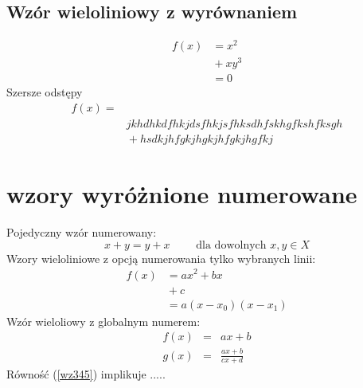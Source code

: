 \documentclass[12pt,oneside,a4paper]{book} %
\theoremstyle{break}
\begin{document}
\subsection{Wzór wieloliniowy z wyrównaniem}
\begin{align*}
f(x) &= x^2\\
& {} + xy^3\\
& = 0
\end{align*}
Szersze odstępy  %
\begin{align*} 
f(x)=&\\[5ex]  
&  jkhdhkdfhkjdsfhkjsfhksdhfskhgfkshfksgh\\[5ex]
& {} + hsdkjhfgkjhgkjhfgkjhgfkj
\end{align*}
\section{wzory wyróżnione numerowane}
Pojedyczny wzór numerowany:
\begin{equation}
\label{wz345}%
x+y=y+x \qquad \mbox{ dla dowolnych }x,y\in X
\end{equation}
Wzory wieloliniowe z opcją numerowania tylko wybranych linii:
\begin{align}
\nonumber f(x) &= ax^2+bx\\
\label{wz2} & {} + c\\
\label{wz4} & = a(x-x_0)(x-x_1)
\end{align}
Wzór wieloliowy z globalnym numerem:
\begin{equation}\label{wz3}
\begin{array}{rcl}
f(x)& =& ax+b\\[3ex]
g(x)&=&\frac{ax+b}{cx+d}
\end{array}
\end{equation}
Równość (\ref{wz345}) implikuje .....
\end{document}
